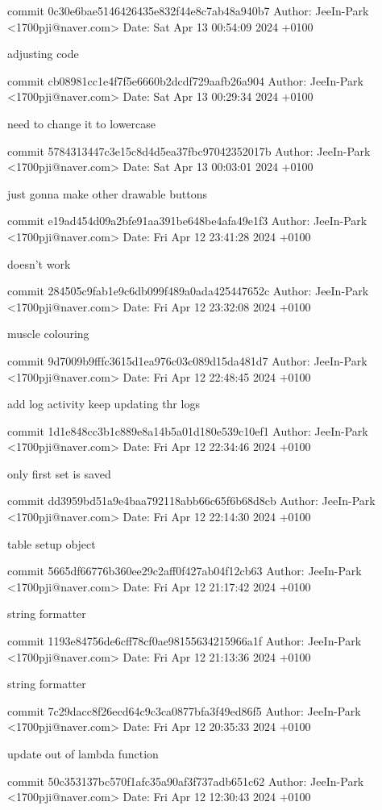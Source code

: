 commit 0c30e6bae5146426435e832f44e8c7ab48a940b7
Author: JeeIn-Park <1700pji@naver.com>
Date:   Sat Apr 13 00:54:09 2024 +0100

    adjusting code

commit cb08981cc1e4f7f5e6660b2dcdf729aafb26a904
Author: JeeIn-Park <1700pji@naver.com>
Date:   Sat Apr 13 00:29:34 2024 +0100

    need to change it to lowercase

commit 5784313447c3e15c8d4d5ea37fbc97042352017b
Author: JeeIn-Park <1700pji@naver.com>
Date:   Sat Apr 13 00:03:01 2024 +0100

    just gonna make other drawable buttons

commit e19ad454d09a2bfe91aa391be648be4afa49e1f3
Author: JeeIn-Park <1700pji@naver.com>
Date:   Fri Apr 12 23:41:28 2024 +0100

    doesn't work

commit 284505c9fab1e9c6db099f489a0ada425447652c
Author: JeeIn-Park <1700pji@naver.com>
Date:   Fri Apr 12 23:32:08 2024 +0100

    muscle colouring

commit 9d7009b9fffc3615d1ea976c03c089d15da481d7
Author: JeeIn-Park <1700pji@naver.com>
Date:   Fri Apr 12 22:48:45 2024 +0100

    add log activity keep updating thr logs

commit 1d1e848cc3b1c889e8a14b5a01d180e539c10ef1
Author: JeeIn-Park <1700pji@naver.com>
Date:   Fri Apr 12 22:34:46 2024 +0100

    only first set is saved

commit dd3959bd51a9e4baa792118abb66c65f6b68d8cb
Author: JeeIn-Park <1700pji@naver.com>
Date:   Fri Apr 12 22:14:30 2024 +0100

    table setup object

commit 5665df66776b360ee29c2aff0f427ab04f12cb63
Author: JeeIn-Park <1700pji@naver.com>
Date:   Fri Apr 12 21:17:42 2024 +0100

    string formatter

commit 1193e84756de6cff78cf0ae98155634215966a1f
Author: JeeIn-Park <1700pji@naver.com>
Date:   Fri Apr 12 21:13:36 2024 +0100

    string formatter

commit 7c29dacc8f26ecd64c9c3ca0877bfa3f49ed86f5
Author: JeeIn-Park <1700pji@naver.com>
Date:   Fri Apr 12 20:35:33 2024 +0100

    update out of lambda function

commit 50c353137bc570f1afc35a90af3f737adb651c62
Author: JeeIn-Park <1700pji@naver.com>
Date:   Fri Apr 12 12:30:43 2024 +0100

